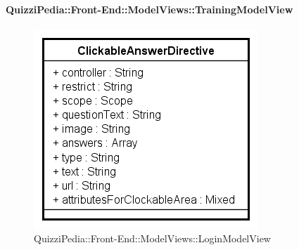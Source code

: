 	\paragraph{QuizziPedia::Front-End::ModelViews::TrainingModelView}
	
	\label{QuizziPedia::Front-End::ModelViews::TrainingModelView}
	
	\begin{figure}[ht]
		\centering
		\includegraphics[scale=0.5,keepaspectratio]{UML/Classi/Front-End/QuizziPedia_Front-end_Templates_ClickableAnswerTemplate.png}
		\caption{QuizziPedia::Front-End::ModelViews::LoginModelView}
	\end{figure} \FloatBarrier
	

